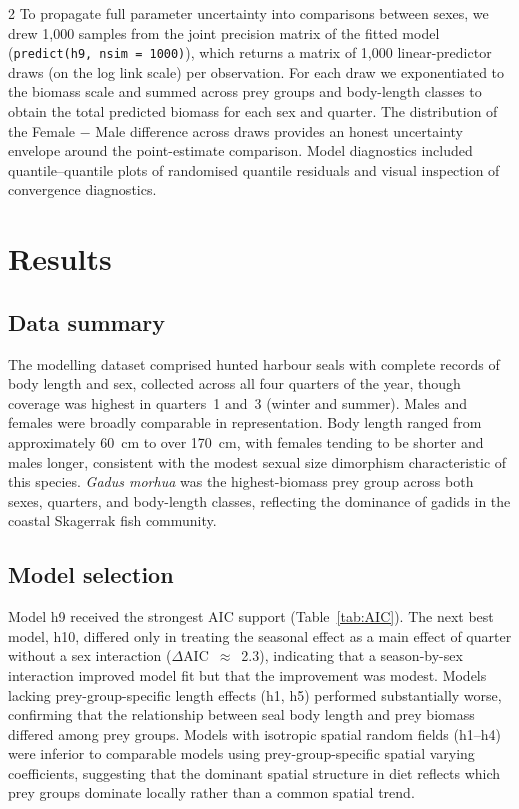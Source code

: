 \begin{spacing}{2}
To propagate full parameter uncertainty into comparisons between sexes, we
drew 1,000 samples from the joint precision matrix of the fitted model
(\texttt{predict(h9, nsim = 1000)}), which returns a matrix of 1,000
linear-predictor draws (on the log link scale) per observation. For each
draw we exponentiated to the biomass scale and summed across prey groups and
body-length classes to obtain the total predicted biomass for each sex and
quarter. The distribution of the Female $-$ Male difference across draws
provides an honest uncertainty envelope around the point-estimate comparison.
Model diagnostics included quantile--quantile plots of randomised quantile
residuals and visual inspection of convergence diagnostics.

\section{Results}

\subsection{Data summary}

The modelling dataset comprised hunted harbour seals with complete records
of body length and sex, collected across all four quarters of the year,
though coverage was highest in quarters~1 and~3 (winter and summer). Males
and females were broadly comparable in representation. Body length ranged
from approximately 60~cm to over 170~cm, with females tending to be shorter
and males longer, consistent with the modest sexual size dimorphism
characteristic of this species. \textit{Gadus morhua} was the highest-biomass
prey group across both sexes, quarters, and body-length classes, reflecting
the dominance of gadids in the coastal Skagerrak fish community.

\subsection{Model selection}

Model h9 received the strongest AIC support (Table~\ref{tab:AIC}). The next
best model, h10, differed only in treating the seasonal effect as a main
effect of quarter without a sex interaction ($\Delta$AIC~$\approx$~2.3),
indicating that a season-by-sex interaction improved model fit but that the
improvement was modest. Models lacking prey-group-specific length effects
(h1, h5) performed substantially worse, confirming that the relationship
between seal body length and prey biomass differed among prey groups. Models
with isotropic spatial random fields (h1--h4) were inferior to comparable
models using prey-group-specific spatial varying coefficients, suggesting
that the dominant spatial structure in diet reflects which prey groups
dominate locally rather than a common spatial trend.


\end{spacing}
